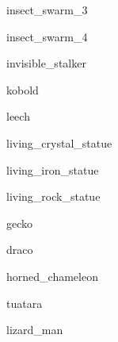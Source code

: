 \documentclass[letterpaper,serif]{module}
\begin{document}
\begin{newmonster}{insect_swarm_3}\end{newmonster}

\begin{newmonster}{insect_swarm_4}\end{newmonster}

\begin{newmonster}{invisible_stalker}\end{newmonster}

\begin{newmonster}{kobold}\end{newmonster}

\begin{newmonster}{leech}\end{newmonster}


\begin{newmonster}{living_crystal_statue}\end{newmonster}

\begin{newmonster}{living_iron_statue}\end{newmonster}

\begin{newmonster}{living_rock_statue}\end{newmonster}


\begin{newmonster}{gecko}\end{newmonster}

\begin{newmonster}{draco}\end{newmonster}

\begin{newmonster}{horned_chameleon}\end{newmonster}

\begin{newmonster}{tuatara}\end{newmonster}

\begin{newmonster}{lizard_man}\end{newmonster}
\end{document}
